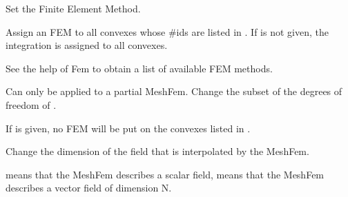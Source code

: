 \documentclass[a4paper,11pt,english]{sphinxmanual}
\begin{document}
\begin{fulllineitems}

\begin{fulllineitems}
\label{\detokenize{python/cmdref_MeshFem:getfem.MeshFem.set_fem}}
Set the Finite Element Method.

Assign an FEM  to all convexes whose \#ids are listed in .
If  is not given, the integration is assigned to all convexes.

See the help of Fem to obtain a list of available FEM methods.

\end{fulllineitems}


\begin{fulllineitems}
\label{\detokenize{python/cmdref_MeshFem:getfem.MeshFem.set_partial}}
Can only be applied to a partial MeshFem. Change the subset of the
degrees of freedom of .

If  is given, no FEM will be put on the convexes listed
in .

\end{fulllineitems}


\begin{fulllineitems}
\label{\detokenize{python/cmdref_MeshFem:getfem.MeshFem.set_qdim}}
Change the  dimension of the field that is interpolated by the MeshFem.

 means that the MeshFem describes a scalar field,  means
that the MeshFem describes a vector field of dimension N.

\end{fulllineitems}


\end{fulllineitems}
\end{document}
